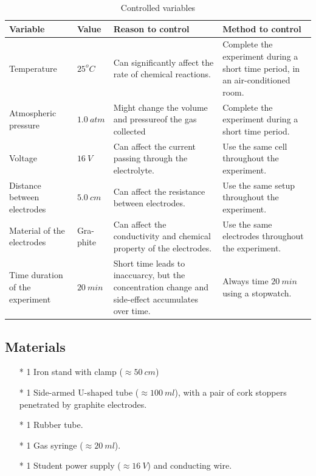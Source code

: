 \documentclass[a4paper]{article}
\begin{document}
\begin{table}
    \centering
    \caption{Controlled variables}
    \label{tab.control}
    \begin{tabularx}{1\textwidth}{p{2cm} p{0.8cm} X X}
        \hline
        Variable                    & Value                  & Reason to control                                          & Method to control                                    \\ \hline
        Temperature              & $25^oC$                & Can significantly affect the rate of chemical reactions. & Complete the experiment during a short time period, in an air-conditioned room. \\
        Atmospheric pressure        & $\SI{1.0 }{atm}$       & Might change the volume and pressureof the gas collected      & Complete the experiment during a short time period. \\
        Voltage                     & $\SI{16 }{V}$          & Can affect the current passing through the electrolyte.                             & Use the same cell throughout the experiment. \\
        Distance between electrodes & $\SI{5.0}{cm}$        & Can affect the resistance between electrodes. & Use the same setup throughout the experiment. \\
        Material of the electrodes  & \makecell{Gra-\\phite}           & Can affect the conductivity and chemical property of the electrodes. & Use the same electrodes throughout the experiment. \\ 
        Time duration of the experiment & $\SI{20}{min}$ & Short time leads to inaccuarcy, but the concentration change and side-effect accumulates over time. & Always time $\SI{20}{min}$ using a stopwatch.\\\hline
    \end{tabularx}
\end{table}

\subsection{Materials}

\begin{itemize}
    \item[*] 1 Iron stand with clamp ($\approx \SI{50}{cm}$)
    \item[*] 1 Side-armed U-shaped tube ($\approx \SI{100}{ml}$), with a pair of cork stoppers penetrated by graphite electrodes.
    \item[*] 1 Rubber tube.
    \item[*] 1 Gas syringe ($\approx \SI{20}{ml}$).
    \item[*] 1 Student power supply ($\approx \SI{16}{V}$) and conducting wire.
\end{itemize}
\end{document}
